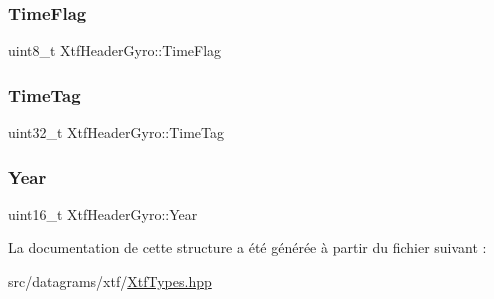 \subsubsection{\texorpdfstring{Time\+Flag}{TimeFlag}}
{\footnotesize\ttfamily uint8\+\_\+t Xtf\+Header\+Gyro\+::\+Time\+Flag}

\mbox{\label{structXtfHeaderGyro_acca62eccaf3ac7899aac8414d8063b95}} 
\subsubsection{\texorpdfstring{Time\+Tag}{TimeTag}}
{\footnotesize\ttfamily uint32\+\_\+t Xtf\+Header\+Gyro\+::\+Time\+Tag}

\mbox{\label{structXtfHeaderGyro_aec617ad1ae79153ed3ad307d5aec9227}} 
\subsubsection{\texorpdfstring{Year}{Year}}
{\footnotesize\ttfamily uint16\+\_\+t Xtf\+Header\+Gyro\+::\+Year}



La documentation de cette structure a été générée à partir du fichier suivant \+:\begin{DoxyCompactItemize}
\item 
src/datagrams/xtf/\hyperlink{XtfTypes_8hpp}{Xtf\+Types.\+hpp}\end{DoxyCompactItemize}
